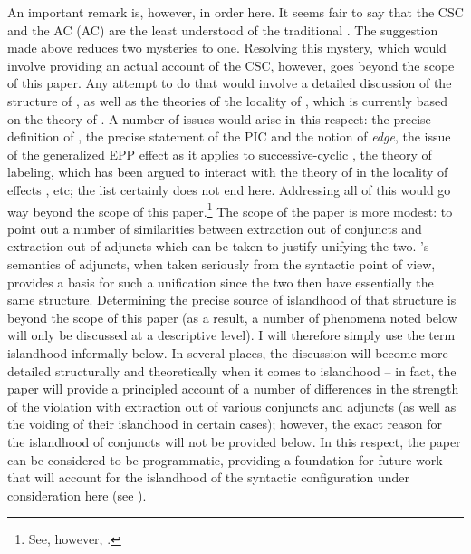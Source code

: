 \documentclass[output=paper]{langsci/langscibook}
\begin{document}
An important remark is, however, in order here. It seems fair to say that the
\gls{CSC} and the \glsdesc{AC} (\gls{AC}) are the least understood of the
traditional . The suggestion made above reduces two mysteries to one.
Resolving this mystery, which would involve providing an actual account of the
\gls{CSC}, however, goes beyond the scope of this paper. Any attempt to do that
would involve a detailed discussion of the structure of , as well
as the theories of the locality of , which is currently based on the
theory of . A number of issues would arise in this respect: the precise
definition of , the precise statement of the \gls{PIC}
and the notion of \emph{edge}, the issue of the generalized
\gls{EPP} effect as
it applies to successive-cyclic , the theory of labeling, which has
been argued to interact with the theory of  in the locality of 
effects \parencite[see][]{Boskovic2015,Boskovic2018}, etc; the list certainly
does not end here. Addressing all of this would go way beyond the scope of this
paper.\footnote{See, however, \textcite{Boskovic2017,Boskovicinprep}.} The
scope of the paper is more modest: to point out a number of similarities
between extraction out of conjuncts and extraction out of adjuncts which can be
taken to justify unifying the two. \citeauthor{Higginbotham1985}’s semantics of
adjuncts, when taken seriously from the syntactic point of view, provides a
basis for such a unification since the two then have essentially the same
structure. Determining the precise source of islandhood of that structure is
beyond the scope of this paper (as a result, a number of phenomena noted below
will only be discussed at a descriptive level). I will therefore simply use the
term islandhood informally below. In several places, the discussion will become
more detailed structurally and theoretically when it comes to islandhood – in
fact, the paper will provide a principled account of a number of differences in
the strength of the violation with extraction out of various conjuncts and
adjuncts (as well as the voiding of their islandhood in certain cases);
however, the exact reason for the islandhood of conjuncts will not be provided
below. In this respect, the paper can be considered to be programmatic,
providing a foundation for future work that will account for the islandhood of
the syntactic configuration under consideration here (see
\citealt{Boskovicinprep}).
\end{document}
